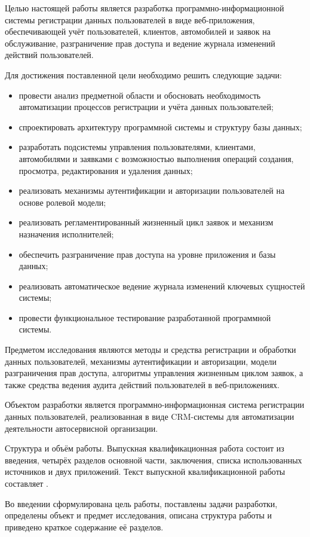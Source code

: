 Целью настоящей работы является разработка программно-информационной системы регистрации данных пользователей в виде веб-приложения, обеспечивающей учёт пользователей, клиентов, автомобилей и заявок на обслуживание, разграничение прав доступа и ведение журнала изменений действий пользователей.

Для достижения поставленной цели необходимо решить следующие задачи:
\begin{itemize}
	\item провести анализ предметной области и обосновать необходимость автоматизации процессов регистрации и учёта данных пользователей;
	\item спроектировать архитектуру программной системы и структуру базы данных;
	\item разработать подсистемы управления пользователями, клиентами, автомобилями и заявками с возможностью выполнения операций создания, просмотра, редактирования и удаления данных;
	\item реализовать механизмы аутентификации и авторизации пользователей на основе ролевой модели;
	\item реализовать регламентированный жизненный цикл заявок и механизм назначения исполнителей;
	\item обеспечить разграничение прав доступа на уровне приложения и базы данных;
	\item реализовать автоматическое ведение журнала изменений ключевых сущностей системы;
	\item провести функциональное тестирование разработанной программной системы.
\end{itemize}

Предметом исследования являются методы и средства регистрации и обработки данных пользователей, механизмы аутентификации и авторизации, модели разграничения прав доступа, алгоритмы управления жизненным циклом заявок, а также средства ведения аудита действий пользователей в веб-приложениях.

Объектом разработки является программно-информационная система регистрации данных пользователей, реализованная в виде CRM-системы для автоматизации деятельности автосервисной организации.

Структура и объём работы. Выпускная квалификационная работа состоит из введения, четырёх разделов основной части, заключения, списка использованных источников и двух приложений. Текст выпускной квалификационной работы составляет .

Во введении сформулирована цель работы, поставлены задачи разработки, определены объект и предмет исследования, описана структура работы и приведено краткое содержание её разделов.

